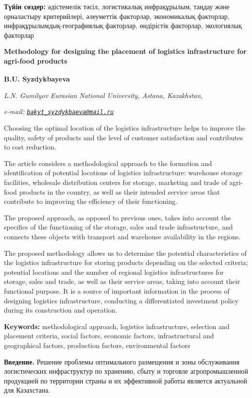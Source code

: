 {\bfseries Түйін сөздер:} әдістемелік тәсіл, логистикалық инфрақұрылым,
таңдау және орналастыру критерийлері, әлеуметтік факторлар, экономикалық
факторлар, инфрақұрылымдық-географиялық факторлар, өндірістік факторлар,
экологиялық факторлар

{\bfseries Methodology for designing the placement of logistics
infrastructure for agri-food products}

{\bfseries B.U. Syzdykbayeva\textsuperscript{\envelope }}

\emph{L.N. Gumilyov Eurasian National University, Astana, Kazakhstan,}

\emph{e-mail:
\href{mailto:bakyt_syzdykbaeva@mail.ru}{\nolinkurl{bakyt\_syzdykbaeva@mail.ru}}}

Choosing the optimal location of the logistics infrastructure helps to
improve the quality, safety of products and the level of customer
satisfaction and contributes to cost reduction.

The article considers a methodological approach to the formation and
identification of potential locations of logistics infrastructure:
warehouse storage facilities, wholesale distribution centers for
storage, marketing and trade of agri-food products in the country, as
well as their intended service areas that contribute to improving the
efficiency of their functioning.

The proposed approach, as opposed to previous ones, takes into account
the specifics of the functioning of the storage, sales and trade
infrastructure, and connects these objects with transport and warehouse
availability in the regions.

The proposed methodology allows us to determine the potential
characteristics of the logistics infrastructure for storing products
depending on the selected criteria; potential locations and the number
of regional logistics infrastructures for storage, sales and trade, as
well as their service areas, taking into account their functional
purpose. It is a source of important information in the process of
designing logistics infrastructure, conducting a differentiated
investment policy during its construction and operation.

{\bfseries Keywords:} methodological approach, logistics infrastructure,
selection and placement criteria, social factors, economic factors,
infrastructural and geographical factors, production factors,
environmental factors

{\bfseries Введение.} Решение проблемы оптимального размещения и зоны
обслуживания логистических инфраструктур по хранению, сбыту и торговле
агропромышленной продукцией по территории страны и их эффективной работы
является актуальной для Казахстана.


